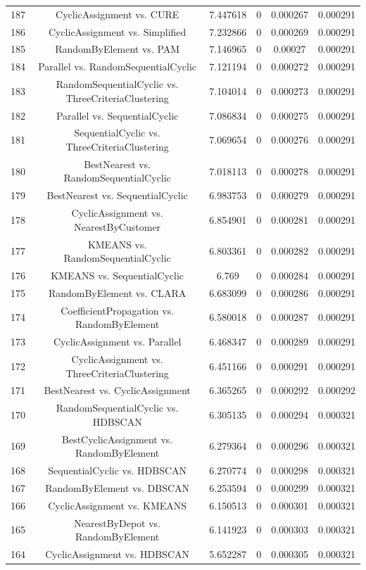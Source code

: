 \documentclass[a4paper,10pt]{article}
\begin{document}
\begin{landscape}
\begin{table}[!htp]
\begin{tabular}{cccccc}
187&CyclicAssignment vs. CURE&7.447618&0&0.000267&0.000291\\
186&CyclicAssignment vs. Simplified&7.232866&0&0.000269&0.000291\\
185&RandomByElement vs. PAM&7.146965&0&0.00027&0.000291\\
184&Parallel vs. RandomSequentialCyclic&7.121194&0&0.000272&0.000291\\
183&RandomSequentialCyclic vs. ThreeCriteriaClustering&7.104014&0&0.000273&0.000291\\
182&Parallel vs. SequentialCyclic&7.086834&0&0.000275&0.000291\\
181&SequentialCyclic vs. ThreeCriteriaClustering&7.069654&0&0.000276&0.000291\\
180&BestNearest vs. RandomSequentialCyclic&7.018113&0&0.000278&0.000291\\
179&BestNearest vs. SequentialCyclic&6.983753&0&0.000279&0.000291\\
178&CyclicAssignment vs. NearestByCustomer&6.854901&0&0.000281&0.000291\\
177&KMEANS vs. RandomSequentialCyclic&6.803361&0&0.000282&0.000291\\
176&KMEANS vs. SequentialCyclic&6.769&0&0.000284&0.000291\\
175&RandomByElement vs. CLARA&6.683099&0&0.000286&0.000291\\
174&CoefficientPropagation vs. RandomByElement&6.580018&0&0.000287&0.000291\\
173&CyclicAssignment vs. Parallel&6.468347&0&0.000289&0.000291\\
172&CyclicAssignment vs. ThreeCriteriaClustering&6.451166&0&0.000291&0.000291\\
171&BestNearest vs. CyclicAssignment&6.365265&0&0.000292&0.000292\\
170&RandomSequentialCyclic vs. HDBSCAN&6.305135&0&0.000294&0.000321\\
169&BestCyclicAssignment vs. RandomByElement&6.279364&0&0.000296&0.000321\\
168&SequentialCyclic vs. HDBSCAN&6.270774&0&0.000298&0.000321\\
167&RandomByElement vs. DBSCAN&6.253594&0&0.000299&0.000321\\
166&CyclicAssignment vs. KMEANS&6.150513&0&0.000301&0.000321\\
165&NearestByDepot vs. RandomByElement&6.141923&0&0.000303&0.000321\\
164&CyclicAssignment vs. HDBSCAN&5.652287&0&0.000305&0.000321\\

\end{tabular}
\end{table}
\end{landscape}
\end{document}
